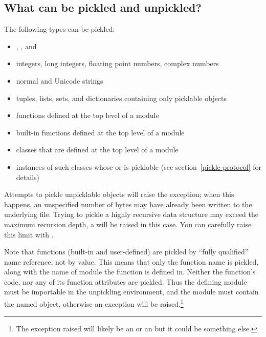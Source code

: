 \subsection{What can be pickled and unpickled?}

The following types can be pickled:

\begin{itemize}

\item {}, , and 

\item integers, long integers, floating point numbers, complex numbers

\item normal and Unicode strings

\item tuples, lists, sets, and dictionaries containing only picklable objects

\item functions defined at the top level of a module

\item built-in functions defined at the top level of a module

\item classes that are defined at the top level of a module

\item instances of such classes whose  or
 is picklable  (see
section~\ref{pickle-protocol} for details)

\end{itemize}

Attempts to pickle unpicklable objects will raise the
 exception; when this happens, an unspecified
number of bytes may have already been written to the underlying file.
Trying to pickle a highly recursive data structure may exceed the
maximum recursion depth, a  will be raised
in this case. You can carefully raise this limit with 
.

Note that functions (built-in and user-defined) are pickled by ``fully
qualified'' name reference, not by value.  This means that only the
function name is pickled, along with the name of module the function
is defined in.  Neither the function's code, nor any of its function
attributes are pickled.  Thus the defining module must be importable
in the unpickling environment, and the module must contain the named
object, otherwise an exception will be raised.\footnote{The exception
raised will likely be an  or an
 but it could be something else.}

